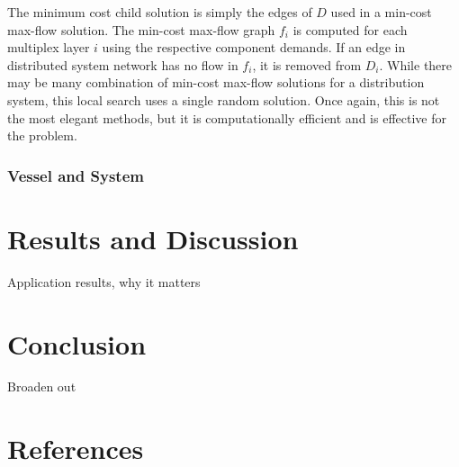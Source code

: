 \documentclass[preprint,12pt]{elsarticle}
\begin{document}
The minimum cost child solution is simply the edges of $D$ used in a min-cost max-flow solution. The min-cost max-flow graph $f_i$ is computed for each multiplex layer $i$ using the respective component demands. If an edge in distributed system network has no flow in $f_i$, it is removed from $D_i$. While there may be many combination of min-cost max-flow solutions for a distribution system, this local search uses a single random solution. Once again, this is not the most elegant methods, but it is computationally efficient and is effective for the problem.


\subsubsection{Vessel and System}


\section{Results and Discussion}
Application results, why it matters

\section{Conclusion}
Broaden out


\section*{References}
 





%
%
%
\end{document}
